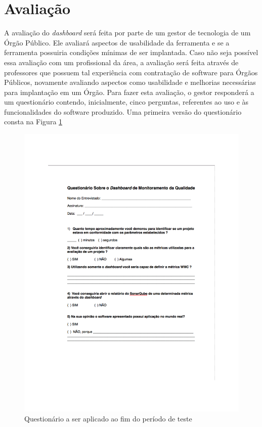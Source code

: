 \section{Avaliação}
A avaliação do \textit{dashboard} será feita por parte de um gestor de tecnologia de um Órgão Público. Ele avaliará aspectos de usabilidade da ferramenta e se a ferramenta possuiria condições mínimas de ser implantada. Caso não seja possível essa avaliação com um profissional da área, a avaliação será feita através de professores que possuem tal experiência com contratação de software para Órgãos Públicos, novamente avaliando aspectos como usabilidade e melhorias necessárias para implantação em um Órgão.
Para fazer esta avaliação, o gestor responderá a um questionário contendo, inicialmente, cinco perguntas, referentes ao uso e às funcionalidades do software produzido. Uma primeira versão do questionário consta na Figura \ref{img:questionario}

\graphicspath{{figuras/}}
\begin{figure}[h!]
\centering
\includegraphics[scale=1.00]{questionario}
\caption{Questionário a ser aplicado ao fim do período de teste}
\label{img:questionario}
\end{figure}

